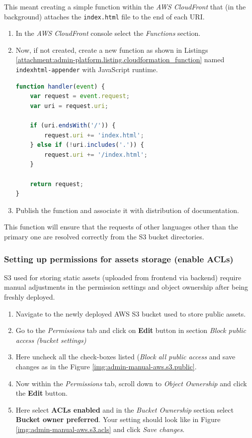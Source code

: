 This meant creating a simple function within the \textit{AWS CloudFront} that (in the background) attaches the \texttt{index.html} file to the end of each URI.

\begin{enumerate}
    \item In the \textit{AWS CloudFront} console select the \textit{Functions} section.
    \item Now, if not created, create a new function as shown in Listings \ref{attachment:admin-platform.listing.cloudformation_function}  named \texttt{indexhtml-appender} with JavaScript runtime.
\begin{lstlisting}[language=javascript,caption={AWS CloudFront function to  append \texttt{index.html} to each URI}]
function handler(event) {
    var request = event.request;
    var uri = request.uri;

    if (uri.endsWith('/')) {
        request.uri += 'index.html';
    } else if (!uri.includes('.')) {
        request.uri += '/index.html';
    }

    return request;
}
\end{lstlisting}
\label{attachment:admin-platform.listing.cloudformation_function}
\item Publish the function and associate it with distribution of documentation.
\end{enumerate}

This function will ensure that the requests of other languages other than the primary one are resolved correctly from the \ac{S3} bucket directories.

\subsubsection{Setting up permissions for assets storage (enable ACLs)}
\label{attachments:admin-manual-aws.s3.permissions}
\ac{S3} used for storing static assets (uploaded from frontend via backend) require manual adjustments in the permission settings and object ownership after being freshly deployed.

\begin{enumerate}
    \item Navigate to the newly deployed AWS \ac{S3} bucket used to store public assets.
    \item Go to the \textit{Permissions} tab and click on \textbf{Edit} button in section \textit{Block public access (bucket settings)}
    \item Here uncheck all the check-boxes listed (\textit{Block all public access} and save changes as in the Figure \ref{img:admin-manual-aws.s3.public}.
    \item Now within the \textit{Permissions} tab, scroll down to \textit{Object Ownership} and click the \textbf{Edit} button. 
    \item Here select \textbf{ACLs enabled} and in the \textit{Bucket Ownership} section select \textbf{Bucket owner preferred}. Your setting should look like in Figure \ref{img:admin-manual-aws.s3.acls} and click \textit{Save changes}.
\end{enumerate}

